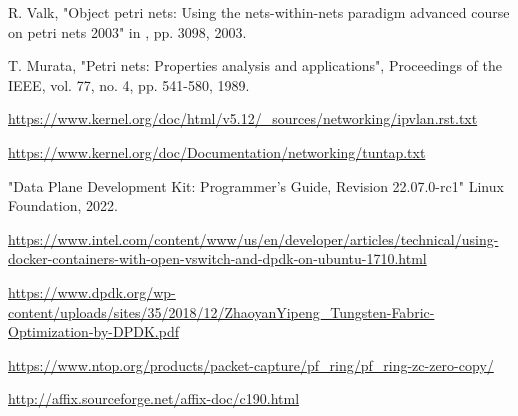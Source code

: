 \documentclass[conference]{IEEEtran}
\begin{document}
\begin{thebibliography}{1}
R. Valk, "Object petri nets: Using the nets-within-nets paradigm advanced course on petri nets 2003" in , pp. 3098, 2003.

T. Murata, "Petri nets: Properties analysis and applications", Proceedings of the IEEE, vol. 77, no. 4, pp. 541-580, 1989.

\url{https://www.kernel.org/doc/html/v5.12/_sources/networking/ipvlan.rst.txt}

\url{https://www.kernel.org/doc/Documentation/networking/tuntap.txt}

"Data Plane Development Kit: Programmer's Guide, Revision 22.07.0-rc1" Linux Foundation, 2022.

\url{https://www.intel.com/content/www/us/en/developer/articles/technical/using-docker-containers-with-open-vswitch-and-dpdk-on-ubuntu-1710.html}

\url{https://www.dpdk.org/wp-content/uploads/sites/35/2018/12/ZhaoyanYipeng_Tungsten-Fabric-Optimization-by-DPDK.pdf}

\url{https://www.ntop.org/products/packet-capture/pf_ring/pf_ring-zc-zero-copy/}

\url{http://affix.sourceforge.net/affix-doc/c190.html}

\end{thebibliography}

\end{document}
